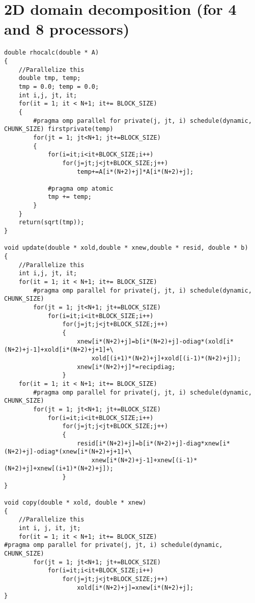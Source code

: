 \documentclass[11pt]{article}
\begin{document}
\section{2D domain decomposition (for 4 and 8 processors)}
\begin{lstlisting}
double rhocalc(double * A)
{
	//Parallelize this
	double tmp, temp;
	tmp = 0.0; temp = 0.0;
	int i,j, jt, it;
	for(it = 1; it < N+1; it+= BLOCK_SIZE)
	{
		#pragma omp parallel for private(j, jt, i) schedule(dynamic, CHUNK_SIZE) firstprivate(temp)
		for(jt = 1; jt<N+1; jt+=BLOCK_SIZE)
		{
			for(i=it;i<it+BLOCK_SIZE;i++)
				for(j=jt;j<jt+BLOCK_SIZE;j++)
					temp+=A[i*(N+2)+j]*A[i*(N+2)+j];
			
			#pragma omp atomic
			tmp += temp;
		}
	}
	return(sqrt(tmp));
}

void update(double * xold,double * xnew,double * resid, double * b)
{
	//Parallelize this
	int i,j, jt, it;
	for(it = 1; it < N+1; it+= BLOCK_SIZE)
		#pragma omp parallel for private(j, jt, i) schedule(dynamic, CHUNK_SIZE) 
		for(jt = 1; jt<N+1; jt+=BLOCK_SIZE)
			for(i=it;i<it+BLOCK_SIZE;i++)
				for(j=jt;j<jt+BLOCK_SIZE;j++)
				{
					xnew[i*(N+2)+j]=b[i*(N+2)+j]-odiag*(xold[i*(N+2)+j-1]+xold[i*(N+2)+j+1]+\
						xold[(i+1)*(N+2)+j]+xold[(i-1)*(N+2)+j]);
					xnew[i*(N+2)+j]*=recipdiag;
				}
	for(it = 1; it < N+1; it+= BLOCK_SIZE)
		#pragma omp parallel for private(j, jt, i) schedule(dynamic, CHUNK_SIZE) 
		for(jt = 1; jt<N+1; jt+=BLOCK_SIZE)
			for(i=it;i<it+BLOCK_SIZE;i++)
				for(j=jt;j<jt+BLOCK_SIZE;j++)
				{
					resid[i*(N+2)+j]=b[i*(N+2)+j]-diag*xnew[i*(N+2)+j]-odiag*(xnew[i*(N+2)+j+1]+\
						xnew[i*(N+2)+j-1]+xnew[(i-1)*(N+2)+j]+xnew[(i+1)*(N+2)+j]);
				} 
} 
  
void copy(double * xold, double * xnew)
{
	//Parallelize this
	int i, j, it, jt;
	for(it = 1; it < N+1; it+= BLOCK_SIZE)
#pragma omp parallel for private(j, jt, i) schedule(dynamic, CHUNK_SIZE)
		for(jt = 1; jt<N+1; jt+=BLOCK_SIZE)
			for(i=it;i<it+BLOCK_SIZE;i++)
				for(j=jt;j<jt+BLOCK_SIZE;j++)
					xold[i*(N+2)+j]=xnew[i*(N+2)+j];
}

\end{lstlisting}
\end{document}
